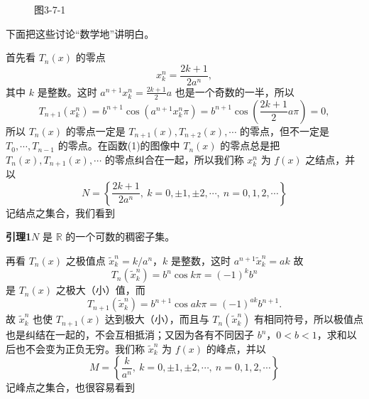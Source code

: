 \begin{figure}[htbp]
\centering
{}
\caption*{图3-7-1}
\end{figure}

下面把这些讨论“数学地”讲明白。

首先看 $T_n(x)$ 的零点
\[
 x_k^n=\frac{2k+1}{2a^n},
\]
其中 $k$ 是整数。这时 $a^{n+1}x_k^n=\frac{2k+1}{2}a$ 也是一个奇数的一半，所以
\[
 T_{n+1}(x_k^n)=b^{n+1}\cos\left(a^{n+1}x_k^n\pi\right)
 =b^{n+1}\cos\left(\frac{2k+1}{2}a\pi\right)=0,
\]
所以 $T_n(x)$ 的零点一定是 $T_{n+1}(x),T_{n+2}(x),\cdots$ 的零点，但不一定是 $T_0,\cdots,T_{n-1}$ 的零点。在函数(1)的图像中 $T_n(x)$ 的零点总是把 $T_n(x),T_{n+1}(x),\cdots$ 的零点纠合在一起，所以我们称 $x_k^n$ 为 $f(x)$ 之结点，并以
\[
 N=\left\{\frac{2k+1}{2a^n},\ k=0,\pm1,\pm2,\cdots,\ n=0,1,2,\cdots\right\}
\]
记结点之集合，我们看到

\textbf{引理1}\quad $N$ 是 $\mathbb R$ 的一个可数的稠密子集。

再看 $T_n(x)$ 之极值点 $\tilde x_k^n=k/a^n$，$k$ 是整数，这时 $a^{n+1}\tilde x_k^n=ak$ 故
\[
 T_n(\tilde x_k^n)=b^n\cos k\pi=(-1)^k b^n
\]
是 $T_n(x)$ 之极大（小）值，而
\[
 T_{n+1}(\tilde x_k^n)=b^{n+1}\cos ak\pi=(-1)^{ak}b^{n+1}.
\]
故 $\tilde x_k^n$ 也使 $T_{n+1}(x)$ 达到极大（小），而且与 $T_n(\tilde x_k^n)$ 有相同符号，所以极值点也是纠结在一起的，不会互相抵消；又因为各有不同因子 $b^n$，$0<b<1$，求和以后也不会变为正负无穷。我们称 $\tilde x_k^n$ 为 $f(x)$ 的峰点，并以
\[
 M=\left\{\frac{k}{a^n},\ k=0,\pm1,\pm2,\cdots,\ n=0,1,2,\cdots\right\}
\]
记峰点之集合，也很容易看到

